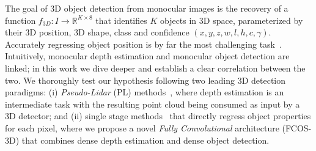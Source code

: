 % 


The goal of 3D object detection from monocular images is the recovery of a function $f_{3D}: I \to \mathbb{R}^{K\times8}$ that identifies $K$ objects in 3D space, parameterized by their 3D position, 3D shape, class and confidence $\left(x,y,z,w,l,h,c,\gamma\right)$. Accurately regressing object position is by far the most challenging task~\cite{manhardt2019roi,simonelli2020demystifying}.  Intuitively, monocular depth estimation and monocular object detection are linked; in this work we dive deeper and establish a clear correlation between the two. We thoroughly test our hypothesis following two leading 3D detection paradigms: (i) \textit{Pseudo-Lidar} (PL) methods~\cite{you2019pseudo,vianney2019refinedmpl,qian2020end,ma2020rethinking}, where depth estimation is an intermediate task with the resulting point cloud being consumed as input by a 3D detector; and (ii) single stage methods~\cite{tian2019fcos,liu2020smoke} that directly regress object properties for each pixel, where we propose a novel \textit{Fully Convolutional} architecture (FCOS-3D)  that combines dense depth estimation and dense object detection.






